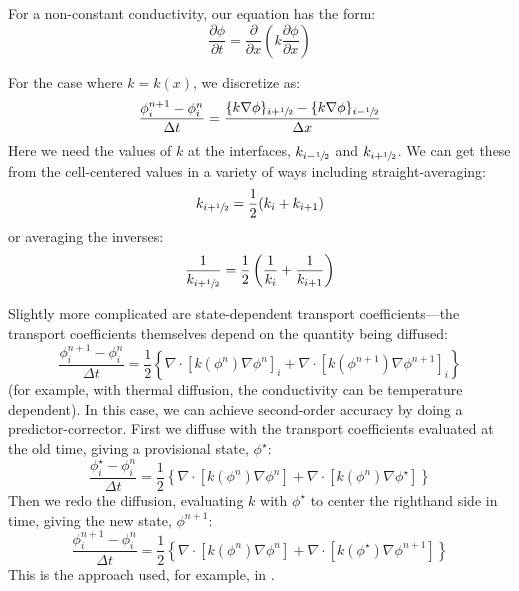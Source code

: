 For a non-constant conductivity, our equation has the form:
\begin{equation}
\frac{\partial \phi}{\partial t} = \frac{\partial}{\partial x} \left (k \frac{\partial \phi}{\partial x} \right )
\end{equation}

For the case where $k = k(x)$,
  we discretize as:
  \begin{equation}
  \frac{\phi_i^{n+1} - \phi_i^n}{\Delta t} = 
        \frac{ \{ k \nabla \phi \}_{i+{\sfrac{1}{2}}} -
               \{ k \nabla \phi \}_{i-{\sfrac{1}{2}}}}{\Delta x}
  \end{equation}
 Here we need the values of $k$ at the interfaces, $k_{i-{\sfrac{1}{2}}}$ and
 $k_{i+{\sfrac{1}{2}}}$.  We can get these from the cell-centered values in a
 variety of ways including straight-averaging:
 \begin{equation}
 k_{i+{\sfrac{1}{2}}} = \frac{1}{2} (k_i + k_{i+1})
 \end{equation}
 or averaging the inverses:
 \begin{equation}
 \frac{1}{k_{i+{\sfrac{1}{2}}}} = \frac{1}{2} \left (\frac{1}{k_i} + \frac{1}{k_{i+1}} \right )
 \end{equation}
 
Slightly more complicated are state-dependent transport
coefficients---the transport coefficients themselves depend on the
quantity being diffused:
  \begin{equation}
  \frac{\phi_i^{n+1} - \phi_i^n}{\Delta t} = 
        \frac{1}{2} \left \{
               \nabla \cdot [ k(\phi^n) \nabla \phi^n ]_i +
               \nabla \cdot [ k(\phi^{n+1}) \nabla \phi^{n+1} ]_i 
               \right \}
  \end{equation}
  (for example, with thermal diffusion, the conductivity can
  be temperature dependent).  In this case, we can achieve second-order
  accuracy by doing a predictor-corrector.  First we diffuse with
  the transport coefficients evaluated at the old time, giving a provisional
  state, $\phi^\star$:
  \begin{equation}
  \frac{\phi_i^\star - \phi_i^n}{\Delta t} = 
        \frac{1}{2} \left \{
               \nabla \cdot [ k(\phi^n) \nabla \phi^n ] +
               \nabla \cdot [ k(\phi^n) \nabla \phi^\star ] 
               \right \}
  \end{equation}
  Then we redo the diffusion, evaluating $k$ with $\phi^\star$ to
  center the righthand side in time, giving the new state, $\phi^{n+1}$:
  \begin{equation}
  \frac{\phi_i^{n+1} - \phi_i^n}{\Delta t} = 
        \frac{1}{2} \left \{
               \nabla \cdot [ k(\phi^n) \nabla \phi^n ] +
               \nabla \cdot [ k(\phi^\star) \nabla \phi^{n+1} ] 
               \right \}
  \end{equation}
  This is the approach used, for example, in \cite{SNpaper}.


